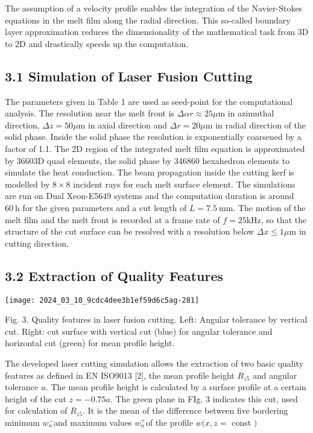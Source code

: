 \documentclass[10pt]{article}
\begin{document}
The assumption of a velocity profile enables the integration of the Navier-Stokes equations in the melt film along the radial direction. This so-called boundary layer approximation reduces the dimensionality of the mathematical task from 3D to 2D and drastically speeds up the computation.

\subsection*{3.1 Simulation of Laser Fusion Cutting}
The parameters given in Table 1 are used as seed-point for the computational analysis. The resolution near the melt front is $\Delta \alpha r \approx 25 \mu \mathrm{m}$ in azimuthal direction, $\Delta z=50 \mu \mathrm{m}$ in axial direction and $\Delta r=20 \mu \mathrm{m}$ in radial direction of the solid phase. Inside the solid phase the resolution is exponentially coarsened by a factor of 1.1. The 2D region of the integrated melt film equation is approximated by $36603 \mathrm{D}$ quad elements, the solid phase by 346860 hexahedron elements to simulate the heat conduction. The beam propagation inside the cutting kerf is modelled by $8 \times 8$ incident rays for each melt surface element. The simulations are run on Dual Xeon-E5649 systems and the computation duration is around $60 \mathrm{~h}$ for the given parameters and a cut length of $L=7.5 \mathrm{~mm}$. The motion of the melt film and the melt front is recorded at a frame rate of $f=25 \mathrm{kHz}$, so that the structure of the cut surface can be resolved with a resolution below $\Delta x \leq 1 \mu \mathrm{m}$ in cutting direction.

\subsection*{3.2 Extraction of Quality Features}
\begin{center}
\texttt{[image: 2024\_03\_10\_9cdc4dee3b1ef59d6c5ag-281]}
\end{center}

Fig. 3. Quality features in laser fusion cutting. Left: Angular tolerance by vertical cut. Right: cut surface with vertical cut (blue) for angular tolerance and horizontal cut (green) for mean profile height.

The developed laser cutting simulation allows the extraction of two basic quality features as defined in EN ISO9013 [2], the mean profile height $R_{z 5}$ and angular tolerance $u$. The mean profile height is calculated by a surface profile at a certain height of the cut $z=-0.75 a$. The green plane in FIg. 3 indicates this cut, used for calculation of $R_{z 5}$. It is the mean of the difference between five bordering minimum $w_{n}^{-}$and maximum values $w_{n}^{+}$of the profile $w(x, z=$ const $)$
\end{document}

